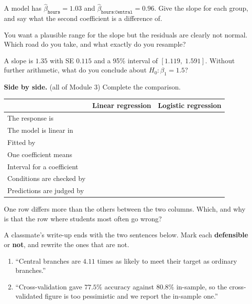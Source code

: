 \documentclass[11pt]{article}
\newcommand{\answerspace}[1]{\vspace{#1}}
\newcommand{\lo}[1]{{\normalfont\small (#1)}}
\begin{document}
\begin{questions}
\begin{parts}
\item A model has $\hat\beta_{\texttt{hours}} = 1.03$ and
$\hat\beta_{\texttt{hours}:\texttt{Central}} = 0.96$. Give the slope for each group, and say what
the second coefficient is a difference of.
\answerspace{4em}

\item You want a plausible range for the slope but the residuals are clearly not normal. Which road
do you take, and what exactly do you resample?
\answerspace{3.5em}

\item A slope is $1.35$ with SE $0.115$ and a 95\% interval of $[1.119,\; 1.591]$. Without further
arithmetic, what do you conclude about $H_0: \beta_1 = 1.5$?
\answerspace{3.5em}
\end{parts}

\item \textbf{Side by side.} \lo{all of Module 3} Complete the comparison.

\begin{center}
\renewcommand{\arraystretch}{2}
\begin{tabularx}{\linewidth}{LLL}
\toprule
 & \textbf{Linear regression} & \textbf{Logistic regression} \\
\midrule
The response is & & \\
The model is linear in & & \\
Fitted by & & \\
One coefficient means & & \\
Interval for a coefficient & & \\
Conditions are checked by & & \\
Predictions are judged by & & \\
\bottomrule
\end{tabularx}
\end{center}

\begin{parts}
\item One row differs more than the others between the two columns. Which, and why is that the
row where students most often go wrong?
\answerspace{3em}

\item A classmate's write-up ends with the two sentences below. Mark each \textbf{defensible} or
\textbf{not}, and rewrite the ones that are not.
\begin{enumerate}[label=\textbf{S\arabic*.}, leftmargin=2.2em, itemsep=.25em, topsep=.35em]
\item ``Central branches are $4.11$ times as likely to meet their target as ordinary branches.''
\item ``Cross-validation gave $77.5\%$ accuracy against $80.8\%$ in-sample, so the
cross-validated figure is too pessimistic and we report the in-sample one.''
\end{enumerate}
\answerspace{5em}
\end{parts}

\end{questions}
\end{document}
